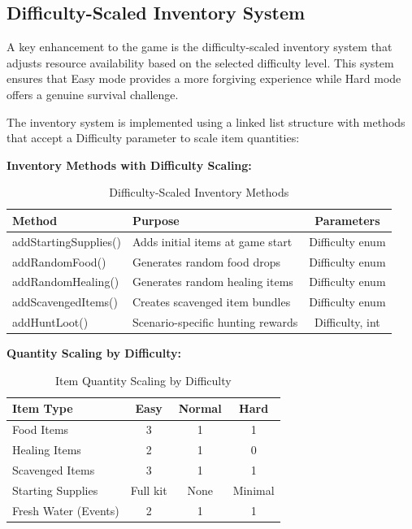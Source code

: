 \documentclass[12pt,a4paper]{article}
\begin{document}
\subsection{Difficulty-Scaled Inventory System}
A key enhancement to the game is the difficulty-scaled inventory system that adjusts resource availability based on the selected difficulty level. This system ensures that Easy mode provides a more forgiving experience while Hard mode offers a genuine survival challenge.

The inventory system is implemented using a linked list structure with methods that accept a Difficulty parameter to scale item quantities:

\textbf{Inventory Methods with Difficulty Scaling:}

\begin{table}[h]
	\centering
	\caption{Difficulty-Scaled Inventory Methods}
	\begin{tabular}{@{}lp{6cm}c@{}}
		\toprule
		\textbf{Method}       & \textbf{Purpose}                  & \textbf{Parameters} \\ \midrule
		addStartingSupplies() & Adds initial items at game start  & Difficulty enum     \\
		addRandomFood()       & Generates random food drops       & Difficulty enum     \\
		addRandomHealing()    & Generates random healing items    & Difficulty enum     \\
		addScavengedItems()   & Creates scavenged item bundles    & Difficulty enum     \\
		addHuntLoot()         & Scenario-specific hunting rewards & Difficulty, int     \\
		\bottomrule
	\end{tabular}
\end{table}

\vspace{0.3cm}

\textbf{Quantity Scaling by Difficulty:}

\begin{table}[h]
	\centering
	\caption{Item Quantity Scaling by Difficulty}
	\begin{tabular}{@{}lccc@{}}
		\toprule
		\textbf{Item Type}   & \textbf{Easy} & \textbf{Normal} & \textbf{Hard} \\ \midrule
		Food Items           & 3             & 1               & 1             \\
		Healing Items        & 2             & 1               & 0             \\
		Scavenged Items      & 3             & 1               & 1             \\
		Starting Supplies    & Full kit      & None            & Minimal       \\
		Fresh Water (Events) & 2             & 1               & 1             \\
		\bottomrule
	\end{tabular}
\end{table}
\end{document}
